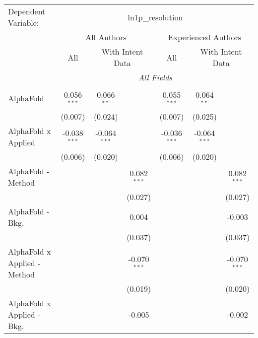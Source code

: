 \begingroup
\centering
\begin{tabular}{lcccccc}
   \tabularnewline \midrule \midrule
   Dependent Variable: & \multicolumn{6}{c}{ln1p\_resolution}\\
 & \multicolumn{3}{c}{All Authors} & \multicolumn{3}{c}{Experienced Authors} \\
\cmidrule(lr){2-4} \cmidrule(lr){5-7}
 & \multicolumn{1}{c}{All} & \multicolumn{2}{c}{With Intent Data} & \multicolumn{1}{c}{All} & \multicolumn{2}{c}{With Intent Data} \\
\cmidrule(lr){2-2} \cmidrule(lr){3-4} \cmidrule(lr){5-5} \cmidrule(lr){6-7}
 & \multicolumn{6}{c}{\textit{All Fields}} \\ \\
   AlphaFold                      & 0.056$^{***}$  & 0.066$^{**}$   &                & 0.055$^{***}$  & 0.064$^{**}$   &   \\   
                                  & (0.007)        & (0.024)        &                & (0.007)        & (0.025)        &   \\   
   AlphaFold x Applied            & -0.038$^{***}$ & -0.064$^{***}$ &                & -0.036$^{***}$ & -0.064$^{***}$ &   \\   
                                  & (0.006)        & (0.020)        &                & (0.006)        & (0.020)        &   \\   
   AlphaFold - Method             &                &                & 0.082$^{***}$  &                &                & 0.082$^{***}$\\   
                                  &                &                & (0.027)        &                &                & (0.027)\\   
   AlphaFold - Bkg.               &                &                & 0.004          &                &                & -0.003\\   
                                  &                &                & (0.037)        &                &                & (0.037)\\   
   AlphaFold x Applied - Method   &                &                & -0.070$^{***}$ &                &                & -0.070$^{***}$\\   
                                  &                &                & (0.019)        &                &                & (0.020)\\   
   AlphaFold x Applied - Bkg.     &                &                & -0.005         &                &                & -0.002\\   

\end{tabular}
